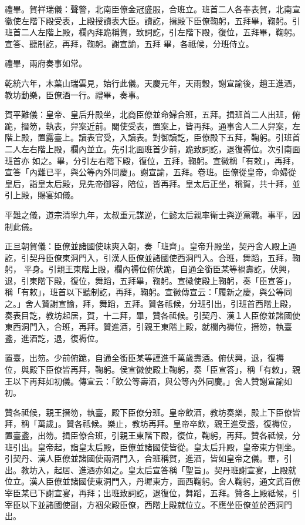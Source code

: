 \begin{pinyinscope}
 禮畢。賀祥瑞儀：聲警，北南臣僚金冠盛服，合班立。班首二人各奉表賀，北南宣徽使左階下殿受表，上殿授讀表大臣。讀訖，揖殿下臣僚鞠躬，五拜畢，鞠躬。引班首二人左階上殿，欄內拜跪稱賀，致詞訖，引左階下殿，復位，五拜畢，鞠躬。宣答、聽制訖，再拜，鞠躬。謝宣諭，五拜
 畢，各祗候，分班侍立。



 禮畢，兩府奏事如常。



 乾統六年，木葉山瑞雲見，始行此儀。天慶元年，天雨穀，謝宣諭後，趙王進酒，教坊動樂，臣僚酒一行。禮畢，奏事。



 賀平難儀：皇帝、皇后升殿坐，北商臣僚並命婦合班，五拜。揖班首二人出班，俯跪，搢笏，執表，舁案近前。閣使受表，置案上，皆再拜。通事舍人二人舁案，左階上殿，置露臺上。讀表官受，入讀表。對御讀訖，臣僚殿下五拜，鞠躬。引班首二人左右階上殿，欄內並立。先引北面班首少前，跪致詞訖，退復褥位。次引南面班首亦
 如之。畢，分引左右階下殿，復位，五拜，鞠躬。宣徽稱「有敕」，再拜，宣答「內難已平，與公等內外同慶」。謝宣諭，五拜。卷班。臣僚從皇帝，命婦從皇后，詣皇太后殿，見先帝御容，陪位，皆再拜。皇太后正坐，稱賀，共十拜，並引上殿，賜宴如儀。



 平難之儀，道宗清寧九年，太叔重元謀逆，仁懿太后親率衛士與逆黨戰。事平，因制此儀。



 正旦朝賀儀：臣僚並諸國使昧爽入朝，奏「班齊」。皇帝升殿坐，契丹舍人殿上通訖，引契丹臣僚東洞門入，引漢人臣僚並諸國使西洞門入。合班，舞蹈，五拜，鞠躬，
 平身。引親王東階上殿，欄內褥位俯伏跪，自通全銜臣某等禍壽訖，伏興，退，引東階下殿，復位，舞蹈，五拜畢，鞠躬。宣徽使殿上鞠躬，奏「臣宣答」，稱「有敕」，班首以下聽制訖，再拜，鞠躬。宣徽傳宣云：「履新之慶，與公等同之。」舍人贊謝宣諭，拜，舞蹈，五拜。贊各祗候，分班引出，引班首西階上殿，奏表目訖，教坊起居，賀，十二拜，畢，贊各祗候。引契丹、漢１人臣僚並諸國使東西洞門入，合班，再拜。贊進酒，引親王東階上殿，就欄內褥位，搢笏，執臺盞，進酒訖，退，復褥位。



 置臺，出笏。少前俯跪，自通全銜臣某等謹進千萬歲壽酒。俯伏興，退，復褥
 位，與殿下臣僚皆再拜，鞠躬。侯宣徽使殿上鞠躬，奏「臣宣答」，稱「有敕」，親王以下再拜如初儀。傳宣云：「飲公等壽酒，與公等內外同慶。」舍人贊謝宣諭如初。



 贊各祗候，親王搢笏，執臺，殿下臣僚分班。皇帝飲酒，教坊奏樂，殿上下臣僚皆拜，稱「萬歲」。贊各祗候。樂止，教坊再拜。皇帝卒飲，親王進受盞，復褥位，置臺盞，出笏。揖臣僚合班，引親王東階下殿，復位，鞠躬，再拜。贊各祗候，分班引出。皇帝起，詣皇太后殿，臣僚並諸國使皆從。皇太后升殿，皇帝東方側坐。引契丹、漢人臣僚並諸國使兩洞門入，合班稱賀，進酒，皆如皇帝之儀。畢，引
 出。教坊入，起居、進酒亦如之。皇太后宣答稱「聖旨」。契丹班謝宣宴，上殿就位立。漢人臣僚並諸國使東洞門入，丹墀東方，面西鞠躬。舍人鞠躬，通文武百僚宰臣某已下謝宣宴，再拜；出班致詞訖，退復位，舞蹈，五拜。贊各上殿祗候，引宰臣以下並諸國使副，方裀朵殿臣僚，西階上殿就位立。不應坐臣僚並於西洞門出。




\end{pinyinscope}
